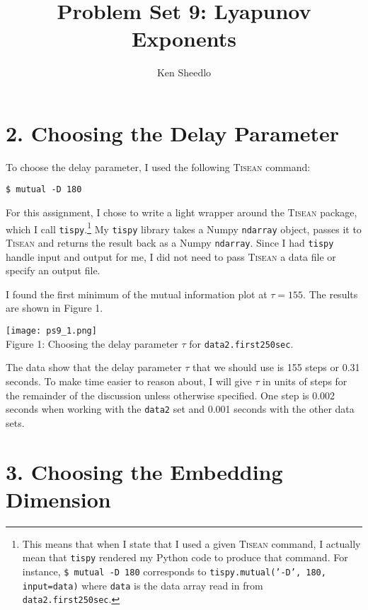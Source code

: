 \documentclass[12pt, letterpaper]{article}
\title{Problem Set 9: Lyapunov Exponents}
\author{Ken Sheedlo}
\begin{document}
\maketitle{}

\section*{2. Choosing the Delay Parameter}

To choose the delay parameter, I used the following \textsc{Tisean} command:

\vspace{1em}
\texttt{\$ mutual -D 180}
\vspace{1em}

For this assignment, I chose to write a light wrapper around the \textsc{Tisean}
package, which I call \texttt{tispy}.\footnote{This means that when I state that I used
a given \textsc{Tisean} command, I actually mean that \texttt{tispy} rendered my Python code
to produce that command. For instance, \texttt{\$ mutual -D 180} corresponds to 
\texttt{tispy.mutual('-D', 180, input=data)} where \texttt{data} is the data array 
read in from \texttt{data2.first250sec}.} My \texttt{tispy} library takes a Numpy 
\texttt{ndarray} object, passes it to \textsc{Tisean} and returns the result
back as a Numpy \texttt{ndarray}. Since I had \texttt{tispy} handle input and 
output for me, I did not need to pass \textsc{Tisean} a data file or specify an 
output file.

I found the first minimum of the mutual information plot at $\tau=155$. The 
results are shown in Figure 1.

\begin{center}
\texttt{[image: ps9\_1.png]}
\\
Figure 1: Choosing the delay parameter $\tau$ for \texttt{data2.first250sec}.
\end{center}

The data show that the delay parameter $\tau$ that we should use is 155 steps or
0.31 seconds. To make time easier to reason about, I will give $\tau$ in units of
steps for the remainder of the discussion unless otherwise specified. One step is
0.002 seconds when working with the \texttt{data2} set and 0.001 seconds with the
other data sets.

\section*{3. Choosing the Embedding Dimension}
\end{document}
